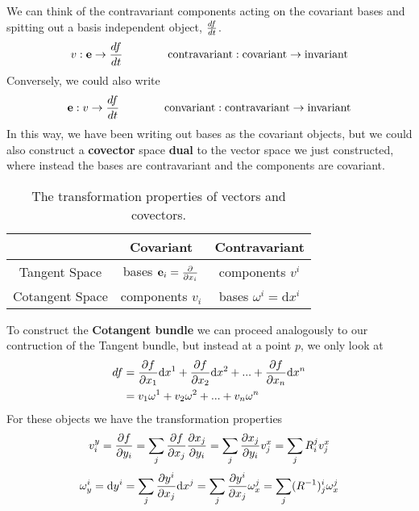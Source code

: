 We can think of the contravariant components acting on the covariant bases and spitting out a basis independent object, $\frac{d f}{d t}$.
\begin{equation}
  v: \mathbf{e} \rightarrow \frac{d f}{d t}   \qquad \qquad
  \text{contravariant} :  \text{covariant}  \rightarrow \text{invariant}
\end{equation}
Conversely, we could also write
\begin{equation}
\mathbf{e} : v \rightarrow \frac{d f}{d t} \qquad \qquad \text{convariant} : \text{contravariant} \rightarrow \text{invariant}
\end{equation}
In this way, we have been writing out bases as the covariant objects, but we could also construct a \textbf{covector} space \textbf{dual} to the vector space we just constructed, where instead the bases are contravariant and the components are covariant.

\begin{table}
  \center
  \def\arraystretch{1.5}
  \begin{tabular}{| c | c | c |}
    \hline
    & Covariant &  Contravariant  \\
    \hline
    Tangent Space & bases $\mathbf{e}_i = \frac{\partial }{\partial x_i}$ & components $v^i$ \\
    Cotangent Space & components $v_i$ & bases $\omega^i = \text{d}x^i$ \\
    \hline
  \end{tabular}
  \caption{The transformation properties of vectors and covectors.}
  \label{tab:trans}
\end{table}

To construct the \textbf{Cotangent bundle} we can proceed analogously to our contruction of the Tangent bundle, but instead at a point $p$, we only look at
\begin{align}
  df & = \frac{\partial f}{\partial x_1} \text{d}x^1 + \frac{\partial f}{\partial x_2} \text{d}x^2 + ...
  + \frac{\partial f}{\partial x_n} \text{d}x^n \\
  & = v_1 \omega^1 + v_2 \omega^2 + ... + v_n \omega^n
\end{align}
For these objects we have the transformation properties
\begin{equation}
  v^y_i =\frac{\partial f}{\partial y_i} = \sum_j \frac{\partial f}{\partial x_j} \frac{\partial x_j}{\partial y_i} = \sum_j \frac{\partial x_j}{\partial y_i} v^x_j = \sum_j R^j_i v^x_j
\end{equation}
\begin{equation}
  \omega^i_y = \text{d}y^i = \sum_j \frac{\partial y^i}{\partial x_j} \text{d}x^j =
  \sum_j \frac{\partial y^i}{\partial x_j} \omega^j_x = \sum_j (R^{-1})^i_j \omega^j_x
\end{equation}

